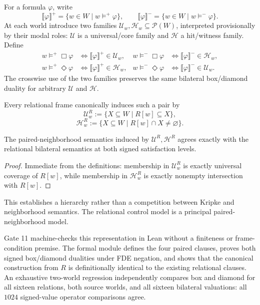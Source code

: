 For a formula \(\varphi\), write
\[
  \llbracket\varphi\rrbracket^{+}
  =\{w\in W\mid w\models^{+}\varphi\},
  \qquad
  \llbracket\varphi\rrbracket^{-}
  =\{w\in W\mid w\models^{-}\varphi\}.
\]
At each world introduce two families \(\mathcal U_w,\mathcal H_w\subseteq\mathcal P(W)\), interpreted provisionally by their modal roles: \(\mathcal U\) is a universal/core family and \(\mathcal H\) a hit/witness family. Define
\begin{align*}
  w\models^{+}\Box\varphi
  &\Longleftrightarrow \llbracket\varphi\rrbracket^{+}\in\mathcal U_w,
  &
  w\models^{-}\Box\varphi
  &\Longleftrightarrow \llbracket\varphi\rrbracket^{-}\in\mathcal H_w,\\
  w\models^{+}\Diamond\varphi
  &\Longleftrightarrow \llbracket\varphi\rrbracket^{+}\in\mathcal H_w,
  &
  w\models^{-}\Diamond\varphi
  &\Longleftrightarrow \llbracket\varphi\rrbracket^{-}\in\mathcal U_w.
\end{align*}
The crosswise use of the two families preserves the same bilateral box/diamond duality for arbitrary \(\mathcal U\) and \(\mathcal H\).

Every relational frame canonically induces such a pair by
\[
  \mathcal U^R_w
  :=\{X\subseteq W\mid R[w]\subseteq X\},
\]
\[
  \mathcal H^R_w
  :=\{X\subseteq W\mid R[w]\cap X\neq\varnothing\}.
\]

\begin{proposition}
The paired-neighborhood semantics induced by \(\mathcal U^R,\mathcal H^R\) agrees exactly with the relational bilateral semantics at both signed satisfaction levels.
\end{proposition}
\begin{proof}
Immediate from the definitions: membership in \(\mathcal U^R_w\) is exactly universal coverage of \(R[w]\), while membership in \(\mathcal H^R_w\) is exactly nonempty intersection with \(R[w]\).
\end{proof}

This establishes a hierarchy rather than a competition between Kripke and neighborhood semantics. The relational control model is a principal paired-neighborhood model.

Gate 11 machine-checks this representation in Lean without a finiteness or frame-condition premise. The formal module defines the four paired clauses, proves both signed box/diamond dualities under FDE negation, and shows that the canonical construction from \(R\) is definitionally identical to the existing relational clauses. An exhaustive two-world regression independently compares box and diamond for all sixteen relations, both source worlds, and all sixteen bilateral valuations: all \(1024\) signed-value operator comparisons agree.

